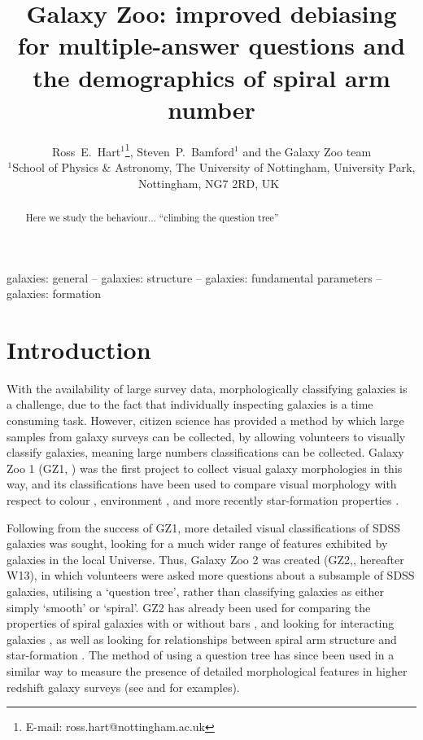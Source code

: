 \documentclass[useAMS,usenatbib]{mn2e}
\begin{document}
\title[Galaxy Zoo: debiasing and spiral arm number]{Galaxy Zoo: improved debiasing for multiple-answer questions and the demographics of spiral arm number}
\author[Hart et al.]{Ross~E.~Hart$^1$\thanks{E-mail: ross.hart@nottingham.ac.uk}, Steven~P.~Bamford$^1$ and the Galaxy Zoo team
\smallskip\\
$^{1}$School of Physics \& Astronomy, The University of Nottingham, University Park, Nottingham, NG7 2RD, UK\
}
\maketitle
\begin{abstract}
Here we study the behaviour...
``climbing the question tree''
\end{abstract}

\begin{keywords}
galaxies: general -- galaxies: structure -- galaxies: fundamental parameters -- galaxies: formation
\end{keywords}

\section{Introduction}
\label{sec:intro}

With the availability of large survey data, morphologically classifying galaxies is a challenge, due to the fact that individually inspecting galaxies is a time consuming task. However, citizen science has provided a method by which large samples from galaxy surveys can be collected, by allowing volunteers to visually classify galaxies, meaning large numbers classifications can be collected. Galaxy Zoo 1 (GZ1, \citealt{Lintott_08,Lintott_11}) was the first project to collect visual galaxy morphologies in this way, and its classifications have been used to compare   visual morphology with respect to colour \citep{Masters_10a,Masters_10b,Bamford_09}, environment \citep{Skibba_09,Bamford_09}, and more recently star-formation properties \citep{Tojeiro_13,Schawinski_14,Smethurst_15}. 

Following from the success of GZ1, more detailed visual classifications of SDSS galaxies was sought, looking for a much wider range of features exhibited by galaxies in the local Universe. Thus, Galaxy Zoo 2 was created (GZ2,\citealt{Willett_13}, hereafter W13), in which volunteers were asked more questions about a subsample of SDSS galaxies, utilising a `question tree', rather than classifying galaxies as either simply `smooth' or `spiral'. GZ2 has already been used for comparing the properties of spiral galaxies with or without bars \citep{Masters_11,Masters_12,Cheung_13}, and looking for interacting galaxies \citep{Casteels_13}, as well as looking for relationships between spiral arm structure and star-formation \citep{Willett_15}. The method of using a question tree has since been used in a similar way to measure the presence of detailed morphological features in higher redshift galaxy surveys (see \citealt{Melvin_14} and \citealt{Simmons_14} for examples). 
\end{document}
